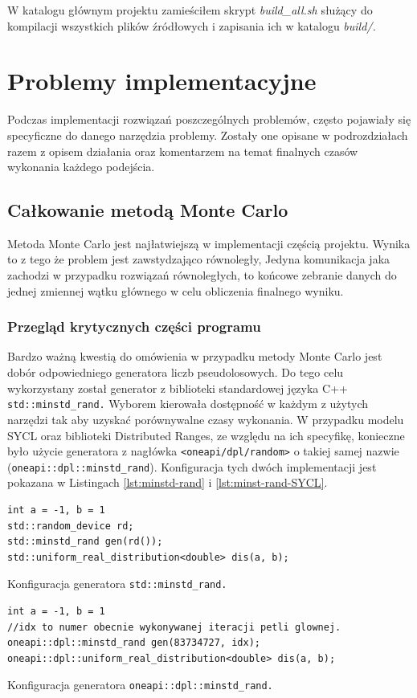 \documentclass[a4paper,12pt]{book} %
\begin{document}
W katalogu głównym projektu zamieściłem skrypt \emph{build\_all.sh} służący do kompilacji wszystkich plików źródłowych i zapisania ich w katalogu \emph{build/.}

\chapter{Problemy implementacyjne}
Podczas implementacji rozwiązań poszczególnych problemów, często pojawiały się specyficzne do danego narzędzia problemy. Zostały one opisane w podrozdziałach razem z opisem działania oraz komentarzem na temat finalnych czasów wykonania każdego podejścia.
\section{Całkowanie metodą Monte Carlo}
Metoda Monte Carlo jest najłatwiejszą w implementacji częścią projektu. Wynika to z tego że problem jest zawstydzająco równoległy, Jedyna komunikacja jaka zachodzi w przypadku rozwiązań równoległych, to końcowe zebranie danych do jednej zmiennej wątku głównego w celu obliczenia finalnego wyniku.
\subsection{Przegląd krytycznych części programu}
Bardzo ważną kwestią do omówienia w przypadku metody Monte Carlo jest dobór odpowiedniego generatora liczb pseudolosowych. Do tego celu wykorzystany został generator z biblioteki standardowej języka C++ \texttt{std::minstd\_rand.} Wyborem kierowała dostępność w każdym z użytych narzędzi tak aby uzyskać porównywalne czasy wykonania. W przypadku modelu SYCL oraz biblioteki Distributed Ranges, ze względu na ich specyfikę, konieczne było użycie generatora z nagłówka \texttt{<oneapi/dpl/random>} o takiej samej nazwie (\texttt{oneapi::dpl::minstd\_rand}). Konfiguracja tych dwóch implementacji jest pokazana w Listingach \ref{lst:minstd-rand} i \ref{lst:minst-rand-SYCL}.

\begin{lstfloat}
\lstset{language=C++}
\begin{lstlisting}[frame=single]
int a = -1, b = 1
std::random_device rd;
std::minstd_rand gen(rd());
std::uniform_real_distribution<double> dis(a, b);
\end{lstlisting}
\caption{Konfiguracja generatora \texttt{std::minstd\_rand.}}
\label{lst:minstd-rand}
\end{lstfloat}

\begin{lstfloat}
\lstset{language=C++}
\begin{lstlisting}[frame=single]
int a = -1, b = 1
//idx to numer obecnie wykonywanej iteracji petli glownej.
oneapi::dpl::minstd_rand gen(83734727, idx);
oneapi::dpl::uniform_real_distribution<double> dis(a, b);
\end{lstlisting}
\caption{Konfiguracja generatora \texttt{oneapi::dpl::minstd\_rand.}}
\label{lst:minst-rand-SYCL}
\end{lstfloat}
\end{document}
